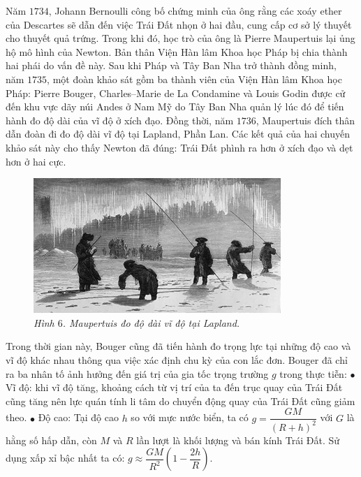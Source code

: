 \begin{multicols}{2}
\begin{figure}[H]
	\end{figure}
	Năm $1734$, Johann Bernoulli công bố chứng minh của ông rằng các xoáy ether của Descartes sẽ dẫn đến việc Trái Đất nhọn ở hai đầu, cung cấp cơ sở lý thuyết cho thuyết quả trứng. Trong khi đó, học trò của ông là Pierre Maupertuis lại ủng hộ mô hình của Newton. Bản thân Viện Hàn lâm Khoa học Pháp bị chia thành hai phái do vấn đề này.
	\vskip 0.1cm
	Sau khi Pháp và Tây Ban Nha trở thành đồng minh, năm $1735$, một đoàn khảo sát gồm ba thành viên của Viện Hàn lâm Khoa học Pháp: Pierre Bouger, Charles--Marie de La Condamine và Louis Godin được cử đến khu vực dãy núi Andes ở Nam Mỹ do Tây Ban Nha quản lý lúc đó để tiến hành đo độ dài của vĩ độ ở xích đạo. Đồng thời, năm $1736$, Maupertuis đích thân dẫn đoàn đi đo độ dài vĩ độ tại Lapland, Phần Lan. Các kết quả của hai chuyến khảo sát này cho thấy Newton đã đúng: Trái Đất phình ra hơn ở xích đạo và dẹt hơn ở hai cực.
	\begin{figure}[H]
		\vspace*{-5pt}
		\centering
		\captionsetup{labelformat= empty, justification=centering}
		\includegraphics[width =1\linewidth]{6}
		\caption{\small\textit{\color{timhieukhoahoc}Hình $6$. Maupertuis đo độ dài vĩ độ tại Lapland.}}
		\vspace*{-10pt}
	\end{figure}
	Trong thời gian này, Bouger cũng đã tiến hành đo trọng lực tại những độ cao và vĩ độ khác nhau thông qua việc xác định chu kỳ của con lắc đơn. Bouger đã chỉ ra ba nhân tố ảnh hưởng đến giá trị của gia tốc trọng trường $g$ trong thực tiễn:
	\vskip 0.1cm
	$\bullet$ Vĩ độ: khi vĩ độ tăng, khoảng cách từ vị trí của ta đến trục quay của Trái Đất cũng tăng nên lực quán tính li tâm do chuyển động quay của Trái Đất cũng giảm theo.
	\vskip 0.1cm
	$\bullet$ Độ cao: Tại độ cao $h$ so với mực nước biển, ta có $g = \dfrac{GM}{(R +h)^2}$ với $G$ là hằng số hấp dẫn, còn $M$ và $R$ lần lượt là khối lượng và bán kính Trái Đất. Sử dụng xấp xỉ bậc nhất ta có: $g \approx \dfrac{GM}{R^2}\left(1 - \dfrac{2h}{R}\right)$.

\end{multicols}
